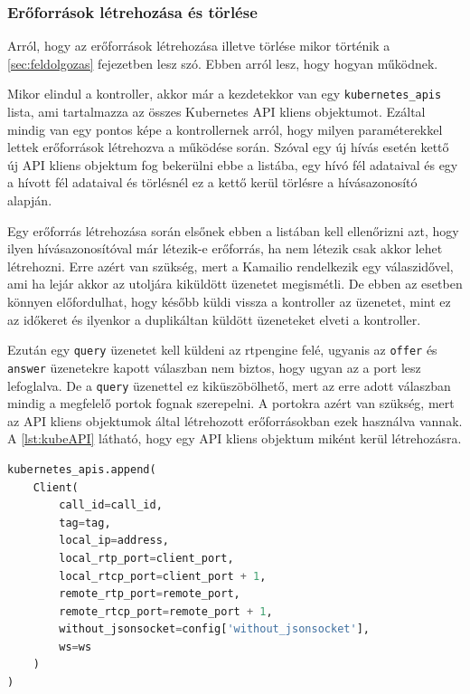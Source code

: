 \subsubsection{Erőforrások létrehozása és törlése}

Arról, hogy az erőforrások létrehozása illetve törlése mikor történik a 
\ref{sec:feldolgozas} fejezetben lesz szó. Ebben arról lesz, hogy hogyan működnek.

Mikor elindul a kontroller, akkor már a kezdetekkor van egy \texttt{kubernetes\_apis}
lista, ami tartalmazza az összes Kubernetes API kliens objektumot. Ezáltal mindig van egy
pontos képe a kontrollernek arról, hogy milyen paraméterekkel lettek erőforrások 
létrehozva a működése során. Szóval egy új hívás esetén kettő új API kliens objektum 
fog bekerülni ebbe a listába, egy hívó fél adataival és egy a hívott fél adataival 
és törlésnél ez a kettő kerül törlésre a hívásazonosító alapján. 

Egy erőforrás létrehozása során elsőnek ebben a listában kell ellenőrizni azt, hogy
ilyen hívásazonosítóval már létezik-e erőforrás, ha nem létezik csak akkor lehet 
létrehozni. Erre azért van szükség, mert a Kamailio rendelkezik egy válaszidővel, ami ha 
lejár akkor az utoljára kiküldött üzenetet megismétli. De ebben az esetben könnyen 
előfordulhat, hogy később küldi vissza a kontroller az üzenetet, mint ez az időkeret és 
ilyenkor a duplikáltan küldött üzeneteket elveti a kontroller.

Ezután egy \texttt{query} üzenetet kell küldeni az rtpengine felé, ugyanis az 
\texttt{offer} és \texttt{answer} üzenetekre kapott válaszban nem biztos, hogy ugyan
az a port lesz lefoglalva. De a \texttt{query} üzenettel ez kiküszöbölhető, mert az 
erre adott válaszban mindig a megfelelő portok fognak szerepelni. A portokra azért van
szükség, mert az API kliens objektumok által létrehozott erőforrásokban ezek használva
vannak. A \ref{lst:kubeAPI} látható, hogy egy API kliens objektum miként kerül 
létrehozásra.

\begin{lstlisting}[language=python, caption=Kubernetes API kliens objektum létrehozása, label=lst:kubeAPI]
kubernetes_apis.append(
    Client(
        call_id=call_id,
        tag=tag,
        local_ip=address,
        local_rtp_port=client_port,
        local_rtcp_port=client_port + 1,
        remote_rtp_port=remote_port,
        remote_rtcp_port=remote_port + 1,
        without_jsonsocket=config['without_jsonsocket'],
        ws=ws
    )
)
\end{lstlisting}


